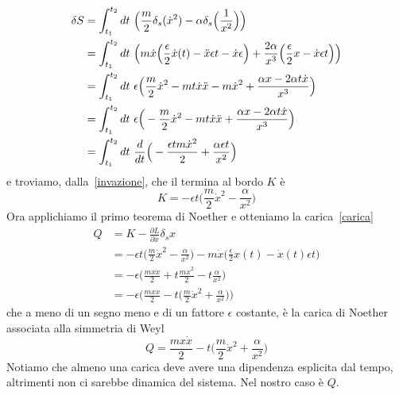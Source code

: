 \begin{example}
\begin{equation}
\begin{aligned}
        \delta S & = \int_{t_1}^{t_2}dt~ \Big( \frac{m}{2} \delta_s (\dot x^2) - \alpha \delta_s \Big (\frac{1}{x^2} \Big) \Big) \\ & = \int_{t_1}^{t_2}dt~ \Big( m \dot x \Big( \frac{\epsilon}{2} \dot x(t) - \ddot x \epsilon t - \dot x \epsilon \Big) + \frac{2 \alpha}{x^3} \Big( \frac{\epsilon}{2} x - \dot x \epsilon t \Big) \Big) \\ & = \int_{t_1}^{t_2}dt~ \epsilon \Big( \frac{m}{2} \dot x^2 - m t \dot x \ddot x - m \dot x^2 + \frac{\alpha x - 2 \alpha t \dot x}{x^3}\Big) \\ & = \int_{t_1}^{t_2}dt~ \epsilon \Big( - \frac{m}{2} \dot x^2 - m t \dot x \ddot x + \frac{\alpha x - 2 \alpha t \dot x}{x^3}\Big) \\ & = \int_{t_1}^{t_2}dt~ \frac{d}{dt} \Big ( - \frac{\epsilon t m \dot x^2}{2} + \frac{\alpha \epsilon t}{x^2} \Big)
    \end{aligned}
    \end{equation}
        e troviamo, dalla~\eqref{invazione}, che il termina al bordo $K$ è 
    \begin{equation*}
        K = - \epsilon t \Big (\frac{m}{2} \dot x^2 - \frac{\alpha}{x^2} \Big)
    \end{equation*}
        Ora applichiamo il primo teorema di Noether e otteniamo la carica~\eqref{carica} 
    \begin{equation}
    \begin{aligned}
        Q & = K - \frac{\partial L}{\partial \dot x} \delta_s x \\ & = - \epsilon t \Big (\frac{m}{2} \dot x^2 - \frac{\alpha}{x^2} \Big) - m \dot x \Big (\frac{\epsilon}{2} x(t) - \dot x(t) \epsilon t \Big ) \\ & = - \epsilon \Big ( \frac{m x \dot x }{2} + t \frac{m \dot x^2}{2} - t \frac{\alpha}{x^2} \Big) \\ & = - \epsilon \Big ( \frac{m x \dot x}{2} - t \Big ( \frac{m}{2} \dot x^2 + \frac{\alpha}{x^2} \Big ) \Big )
    \end{aligned}
    \end{equation}
        che a meno di un segno meno e di un fattore $\epsilon$ costante, è la carica di Noether associata alla simmetria di Weyl
    \begin{equation} \label{carica1}
        Q = \frac{m x \dot x}{2} - t \Big( \frac{m}{2} \dot x^2 + \frac{\alpha}{x^2} \Big)
    \end{equation}
        Notiamo che almeno una carica deve avere una dipendenza esplicita dal tempo, altrimenti non ci sarebbe dinamica del sistema. Nel nostro caso è $Q$.


\end{example}
